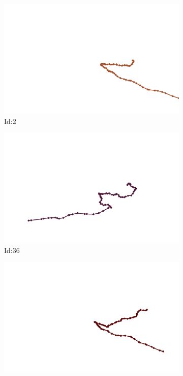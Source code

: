 \documentclass[12pt,twoside]{report}
\begin{document}
\begin{figure}
\centering
\begin{subfigure}[b]{0.20\textwidth}
\centering
\includegraphics[width=\textwidth]{../trajectories/2.png}
\caption{Id:2}
\end{subfigure}
\begin{subfigure}[b]{0.20\textwidth}
\centering
\includegraphics[width=\textwidth]{../trajectories/36.png}
\caption{Id:36}
\end{subfigure}
\begin{subfigure}[b]{0.20\textwidth}
\centering
\includegraphics[width=\textwidth]{../trajectories/54.png}

\end{subfigure}
\end{figure}
\end{document}
